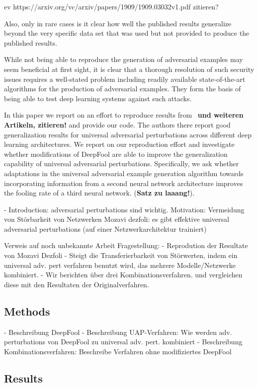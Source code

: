 \documentclass[runningheads]{llncs}
\begin{document}
ev https://arxiv.org/vc/arxiv/papers/1909/1909.03032v1.pdf zitieren?

Also, only in rare cases is it clear how well the published results generalize beyond the very specific data set that was used but not provided to produce the published results. 

While not being able to reproduce the generation of adversarial examples may seem beneficial at first sight, it is clear that a thorough resolution of such security issues requires a well-stated problem including readily available state-of-the-art algorithms for the production of adversarial examples. They form the basis of being able to test deep learning systems against such attacks. 

In this paper we report on an effort to reproduce results from~\cite{moosavi-dezfooli_universal_2017} {\bf und weiteren Artikeln, zitieren!} and provide our code. The authors there report good generalization results for universal adversarial perturbations across different deep learning architectures. We report on our reproduction effort and investigate whether modifications of DeepFool are able to improve the generalization capability of universal adversarial perturbations. Specifically, we ask whether adaptations in the universal adversarial example generation algorithm 
towards incorporating information from a second neural network architecture improves the fooling rate of a third neural network. ({\bf Satz zu laaang!}). 

- Introduction: adversarial perturbations sind wichtig. 
  Motivation: Vermeidung von Störbarkeit von Netzwerken
	Mozavi dezfoli: es gibt effektive universal adversarial perturbations (auf einer Netzwerkarchitektur trainiert)
	
	Verweis auf noch unbekannte Arbeit
	Fragestellung:
		- Reprodution der Resultate von Mozavi Dezfoli
		- Steigt die Transferierbarkeit von Störwerten, indem ein universal adv. pert verfahren benutzt wird, das mehrere Modelle/Netzwerke kombiniert. 
		- Wir berichten über drei Kombinationsverfahren. und vergleichen diese mit den Resultaten der Originalverfahren.
\subsection{Methods}
- Beschreibung DeepFool
- Beschreibung UAP-Verfahren: Wie werden adv. perturbations von DeepFool zu universal adv. pert. kombiniert
- Beschreibung Kombinationsverfahren: Beschreibe Verfahren ohne modifiziertes DeepFool
\subsection{Results}
\end{document}
